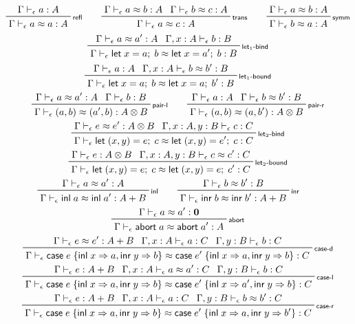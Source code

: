 \documentclass[acmsmall,screen,review]{acmart}
\newcommand{\mb}[1]{\ensuremath{\mathbf{#1}}}
\newcommand{\ms}[1]{\ensuremath{\mathsf{#1}}}
\newcommand{\lto}{\Rightarrow}
\newcommand{\linl}[1]{\ms{inl}\;{#1}}
\newcommand{\linr}[1]{\ms{inr}\;{#1}}
\newcommand{\labort}[1]{\ms{abort}\;{#1}}
\newcommand{\letexpr}[3]{\ensuremath{\ms{let}\;#1 = #2;\;#3}}
\newcommand{\caseexpr}[5]{\ms{case}\;#1\;\{\linl{#2} \lto #3, \linr{#4} \lto #5\}}
\newcommand{\bhyp}[2]{#1 : #2}
\newcommand{\rle}[1]{{\scriptsize\textsf{#1}}}
\newcommand{\hasty}[4]{#1 \vdash_{#2} #3: {#4}}
\newcommand{\teqv}{\approx}
\newcommand{\tmeq}[5]{#1 \vdash_{#2} #3 \teqv #4 : {#5}}
\begin{document}
\begin{gather*}
  \prftree[r]{\rle{refl}}{\hasty{\Gamma}{\epsilon}{a}{A}}{\tmeq{\Gamma}{\epsilon}{a}{a}{A}} \qquad
  \prftree[r]{\rle{trans}}
    {\tmeq{\Gamma}{\epsilon}{a}{b}{A}}
    {\tmeq{\Gamma}{\epsilon}{b}{c}{A}} 
    {\tmeq{\Gamma}{\epsilon}{a}{c}{A}} \qquad
  \prftree[r]{\rle{symm}}
    {\tmeq{\Gamma}{\epsilon}{a}{b}{A}}
    {\tmeq{\Gamma}{\epsilon}{b}{a}{A}}
  \\
  \prftree[r]{\rle{let$_1$-bind}}
    {\tmeq{\Gamma}{\epsilon}{a}{a'}{A}}
    {\hasty{\Gamma, \bhyp{x}{A}}{\epsilon}{b}{B}}
    {\tmeq{\Gamma}{\epsilon}{\letexpr{x}{a}{b}}{\letexpr{x}{a'}{b}}{B}} 
  \\
  \prftree[r]{\rle{let$_1$-bound}}
    {\hasty{\Gamma}{\epsilon}{a}{A}}
    {\tmeq{\Gamma, \bhyp{x}{A}}{\epsilon}{b}{b'}{B}}
    {\tmeq{\Gamma}{\epsilon}{\letexpr{x}{a}{b}}{\letexpr{x}{a}{b'}}{B}}
  \\
  \prftree[r]{\rle{pair-l}}
    {\tmeq{\Gamma}{\epsilon}{a}{a'}{A}}
    {\hasty{\Gamma}{\epsilon}{b}{B}}
    {\tmeq{\Gamma}{\epsilon}{(a, b)}{(a', b)}{A \otimes B}} \qquad
  \prftree[r]{\rle{pair-r}}
    {\hasty{\Gamma}{\epsilon}{a}{A}}
    {\tmeq{\Gamma}{\epsilon}{b}{b'}{B}}
    {\tmeq{\Gamma}{\epsilon}{(a, b)}{(a, b')}{A \otimes B}}
  \\
  \prftree[r]{\rle{let$_2$-bind}}
    {\tmeq{\Gamma}{\epsilon}{e}{e'}{A \otimes B}}
    {\hasty{\Gamma, \bhyp{x}{A}, \bhyp{y}{B}}{\epsilon}{c}{C}}
    {\tmeq{\Gamma}{\epsilon}{\letexpr{(x, y)}{e}{c}}{\letexpr{(x, y)}{e'}{c}}{C}}
  \\
  \prftree[r]{\rle{let$_2$-bound}}
    {\hasty{\Gamma}{\epsilon}{e}{A \otimes B}}
    {\tmeq{\Gamma, \bhyp{x}{A}, \bhyp{y}{B}}{\epsilon}{c}{c'}{C}}
    {\tmeq{\Gamma}{\epsilon}{\letexpr{(x, y)}{e}{c}}{\letexpr{(x, y)}{e}{c'}}{C}}
  \\
  \prftree[r]{\rle{inl}}
    {\tmeq{\Gamma}{\epsilon}{a}{a'}{A}}
    {\tmeq{\Gamma}{\epsilon}{\linl{a}}{\linl{a'}}{A + B}} \qquad
  \prftree[r]{\rle{inr}}
    {\tmeq{\Gamma}{\epsilon}{b}{b'}{B}}
    {\tmeq{\Gamma}{\epsilon}{\linr{b}}{\linr{b'}}{A + B}} \qquad
  \\
  \prftree[r]{\rle{abort}}
    {\tmeq{\Gamma}{\epsilon}{a}{a'}{\mb{0}}}
    {\tmeq{\Gamma}{\epsilon}{\labort{a}}{\labort{a'}}{A}}
  \\
  \prftree[r]{\rle{case-d}}
    {\tmeq{\Gamma}{\epsilon}{e}{e'}{A + B}}
    {\hasty{\Gamma, \bhyp{x}{A}}{\epsilon}{a}{C}}
    {\hasty{\Gamma, \bhyp{y}{B}}{\epsilon}{b}{C}}
    {\tmeq{\Gamma}{\epsilon}{\caseexpr{e}{x}{a}{y}{b}}{\caseexpr{e'}{x}{a}{y}{b}}{C}}
  \\
  \prftree[r]{\rle{case-l}}
    {\hasty{\Gamma}{\epsilon}{e}{A + B}}
    {\tmeq{\Gamma, \bhyp{x}{A}}{\epsilon}{a}{a'}{C}}
    {\hasty{\Gamma, \bhyp{y}{B}}{\epsilon}{b}{C}}
    {\tmeq{\Gamma}{\epsilon}{\caseexpr{e}{x}{a}{y}{b}}{\caseexpr{e'}{x}{a'}{y}{b}}{C}}
  \\
  \prftree[r]{\rle{case-r}}
    {\hasty{\Gamma}{\epsilon}{e}{A + B}}
    {\hasty{\Gamma, \bhyp{x}{A}}{\epsilon}{a}{C}}
    {\tmeq{\Gamma, \bhyp{y}{B}}{\epsilon}{b}{b'}{C}}
    {\tmeq{\Gamma}{\epsilon}{\caseexpr{e}{x}{a}{y}{b}}{\caseexpr{e'}{x}{a}{y}{b'}}{C}}
\end{gather*}
\end{document}
